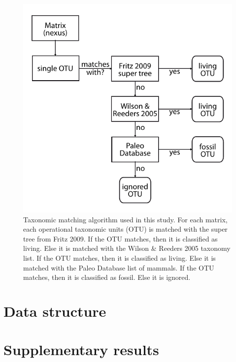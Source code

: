 \begin{figure}[!htbp]
\centering
    \includegraphics[width=1\textwidth]{Supplementary/Supp_figure_Taxonomic_algorithm.pdf}
\caption{Taxonomic matching algorithm used in this study. For each matrix, each operational taxonomic units (OTU) is matched with the super tree from Fritz 2009. If the OTU matches, then it is classified as living. Else it is matched with the Wilson \& Reeders 2005 taxonomy list. If the OTU matches, then it is classified as living. Else it is matched with the Paleo Database list of mammals. If the OTU matches, then it is classified as fossil. Else it is ignored.}
\label{Supp_figure_Taxonomic_algorithm}
\end{figure}





\section{Data structure}

\section{Supplementary results}
